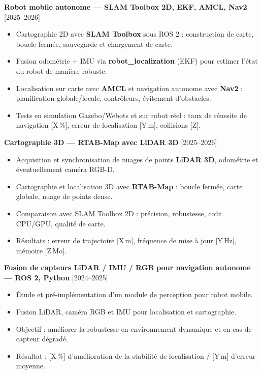 \documentclass[11pt,a4paper]{article}
\newcommand{\cventry}[3]{%
    \textbf{#1} \hfill #2\\
    #3
}
\begin{document}
\cventry{Robot mobile autonome — SLAM Toolbox 2D, EKF, AMCL, Nav2}{[2025--2026]}{%
\begin{itemize}[leftmargin=*, nosep]
    \item Cartographie 2D avec \textbf{SLAM Toolbox} sous ROS 2 : construction de carte, boucle fermée, sauvegarde et chargement de carte.
    \item Fusion odométrie + IMU via \textbf{robot\_localization} (EKF) pour estimer l'état du robot de manière robuste.
    \item Localisation sur carte avec \textbf{AMCL} et navigation autonome avec \textbf{Nav2} : planification globale/locale, contrôleurs, évitement d'obstacles.
    \item Tests en simulation Gazebo/Webots et sur robot réel : taux de réussite de navigation [X\,\%], erreur de localisation [Y\,m], collisions [Z].
\end{itemize}
}

\cventry{Cartographie 3D — RTAB-Map avec LiDAR 3D}{[2025--2026]}{%
\begin{itemize}[leftmargin=*, nosep]
    \item Acquisition et synchronisation de nuages de points \textbf{LiDAR 3D}, odométrie et éventuellement caméra RGB-D.
    \item Cartographie et localisation 3D avec \textbf{RTAB-Map} : boucle fermée, carte globale, nuage de points dense.
    \item Comparaison avec SLAM Toolbox 2D : précision, robustesse, coût CPU/GPU, qualité de carte.
    \item Résultats : erreur de trajectoire [X\,m], fréquence de mise à jour [Y\,Hz], mémoire [Z\,Mo].
\end{itemize}
}

\cventry{Fusion de capteurs LiDAR / IMU / RGB pour navigation autonome — ROS 2, Python}{[2024--2025]}{%
\begin{itemize}[leftmargin=*, nosep]
    \item Étude et pré-implémentation d'un module de perception pour robot mobile.
    \item Fusion LiDAR, caméra RGB et IMU pour localisation et cartographie.
    \item Objectif : améliorer la robustesse en environnement dynamique et en cas de capteur dégradé.
    \item Résultat : [X\,\%] d'amélioration de la stabilité de localisation / [Y\,m] d'erreur moyenne.
\end{itemize}
}
\end{document}
